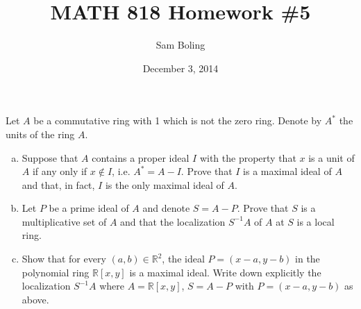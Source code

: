 \documentclass{article}
\title{MATH 818 Homework \#5}
\date{December 3, 2014}
\author{Sam Boling}
\newcounter{Problem}
\newenvironment{Problem}{\begin{Exercise}[name={Problem},
                                          counter={Problem}]}
                        {\end{Exercise}}
\begin{document}
\begin{titlepage}
\maketitle

\end{titlepage}

\begin{Problem}
  Let $A$ be a commutative ring with 1 which is not the zero
  ring. Denote by $A^\ast$ the units of the ring $A$.
  \begin{enumerate}[(a)]
    \item{
      Suppose that $A$ contains a proper ideal $I$ with the property
      that $x$ is a unit of $A$ if any only if $x \notin I$, i.e.
      $A^\ast = A - I$. Prove that $I$ is a maximal ideal of $A$ and
      that, in fact, $I$ is the only maximal ideal of $A$.
    }
    \item{
      Let $P$ be a prime ideal of $A$ and denote $S = A - P$. Prove
      that $S$ is a multiplicative set of $A$ and that the
      localization $S^{-1}A$ of $A$ at $S$ is a local ring.
    }
    \item{
      Show that for every $(a, b) \in \mathbb{R}^2$, the ideal
      $P = (x - a, y - b)$ in the polynomial ring
      $\mathbb{R}[x, y]$ is a maximal ideal. Write down explicitly the
      localization $S^{-1} A$ where $A = \mathbb{R}[x, y]$,
      $S = A - P$ with $P = (x - a, y - b)$ as above.
    }
  \end{enumerate}
\end{Problem}
\end{document}
